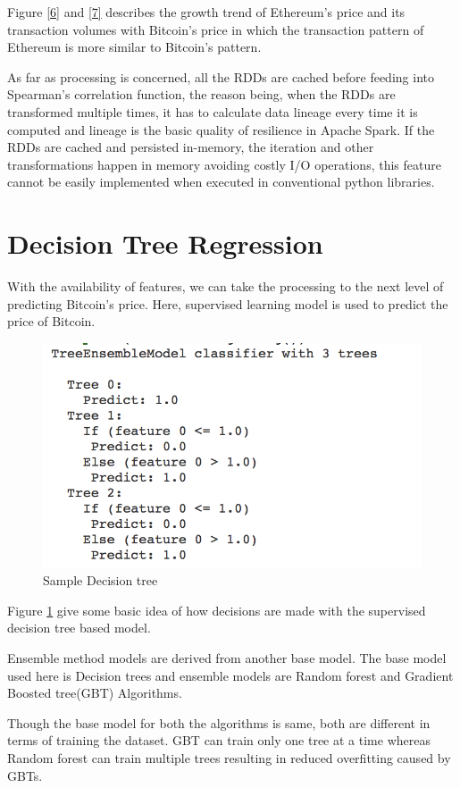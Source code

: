 \documentclass[sigconf]{acmart}
\begin{document}
Figure \ref{6} and \ref{7} describes the growth trend of Ethereum's price and its transaction volumes with Bitcoin's price in which the transaction pattern of Ethereum is more similar to Bitcoin's pattern. 

As far as processing is concerned, all the RDDs are cached before feeding into Spearman's correlation function, the reason being, when the RDDs are transformed multiple times, it has to calculate data lineage every time it is computed and lineage is the basic quality of resilience in Apache Spark. If the RDDs are cached and persisted in-memory, the iteration and other transformations happen in memory avoiding costly I/O operations, this feature cannot be easily implemented when executed in conventional python libraries.


\section{Decision Tree Regression}
With the availability of features, we can take the processing to the next level of predicting Bitcoin's price. Here, supervised learning model is used to predict the price of Bitcoin.

\begin{figure}[!ht]
  \centering\includegraphics[width=0.75\columnwidth]{images/Decisiontree.png}
  \caption{Sample Decision tree \cite{api:docs}}
  \label{fig:8decisiongree}
\end{figure}
 

Figure \ref{fig:8decisiongree} give some basic idea of how decisions are made with the supervised decision tree based model.

Ensemble method models are derived from another base model. The base model used here is Decision trees and ensemble models are Random forest and Gradient Boosted tree(GBT) Algorithms.

Though the base model for both the algorithms is same, both are different in terms of training the dataset. GBT can train only one tree at a time whereas Random forest can train multiple trees resulting in reduced overfitting caused by GBTs.
\end{document}
